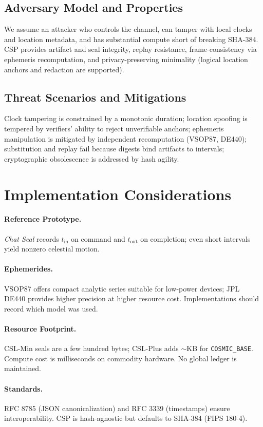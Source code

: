 \documentclass[11pt]{article}
\begin{document}
\subsection*{Adversary Model and Properties}
We assume an attacker who controls the channel, can tamper with local clocks and location metadata, and has substantial compute short of breaking SHA-384. CSP provides artifact and seal integrity, replay resistance, frame-consistency via ephemeris recomputation, and privacy-preserving minimality (logical location anchors and redaction are supported).

\subsection*{Threat Scenarios and Mitigations}
Clock tampering is constrained by a monotonic duration; location spoofing is tempered by verifiers' ability to reject unverifiable anchors; ephemeris manipulation is mitigated by independent recomputation (VSOP87, DE440); substitution and replay fail because digests bind artifacts to intervals; cryptographic obsolescence is addressed by hash agility.

\section{Implementation Considerations}
\paragraph{Reference Prototype.} \emph{Chat Seal} records $t_{\text{in}}$ on command and $t_{\text{out}}$ on completion; even short intervals yield nonzero celestial motion.

\paragraph{Ephemerides.} VSOP87 offers compact analytic series suitable for low-power devices; JPL DE440 provides higher precision at higher resource cost. Implementations should record which model was used.

\paragraph{Resource Footprint.} CSL-Min seals are a few hundred bytes; CSL-Plus adds $\sim$KB for \texttt{COSMIC\_BASE}. Compute cost is milliseconds on commodity hardware. No global ledger is maintained.

\paragraph{Standards.} RFC 8785 (JSON canonicalization) and RFC 3339 (timestamps) ensure interoperability. CSP is hash-agnostic but defaults to SHA-384 (FIPS 180-4).
\end{document}

